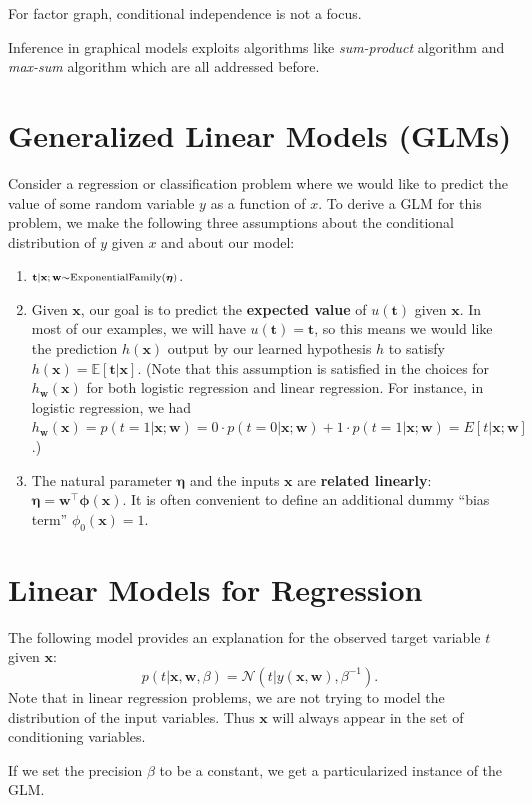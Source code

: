 \documentclass[a4paper]{book}
\newcommand{\up}{\mathrm}
\newcommand{\wave}{\scriptsize{\sim}}
\renewcommand{\bf}{\mathbf}
\renewcommand{\cal}{\mathcal}
\newcommand{\bb}{\mathbb}
\newcommand{\imp}[1]{\textit{#1}}
\newcommand{\bs}{\boldsymbol}
\begin{document}
For factor graph, conditional independence is not a focus.

Inference in graphical models exploits algorithms like \imp{sum-product} algorithm and \imp{max-sum} algorithm which are all addressed before.
\section{Generalized Linear Models (GLMs)}
Consider a regression or classification problem where we would like to predict the value of some random variable $y$ as a function of $x$. To derive a GLM for this problem, we make the following three assumptions about the conditional distribution of $y$ given $x$ and about our model:
\begin{enumerate}
	\item $\bf{t}|\bf{x};\bf{w} \wave \up{ExponentialFamily}(\bs{\eta})$.		
	\item Given $\bf{x}$, our goal is to predict the \textbf{expected value} of $u(\bf{t})$ given $\bf{x}$.
	In most of our examples, we will have $u(\bf{t}) = \bf{t}$, so this means we
	would like the prediction $h(\bf{x})$ output by our learned hypothesis $h$ to satisfy $h(\bf{x})=\bb{E}[\bf{t|x}]$. (Note that this assumption is satisfied in the choices for $h_{\bf{w}}(\bf{x})$ for both logistic regression and linear regression. For
	instance, in logistic regression, we had $h_{\bf{w}}(\bf{x}) = p(t = 1|\bf{x};\bf{w})=0 \cdot p(t=0|\bf{x};\bf{w}) + 1\cdot p(t = 1|\bf{x};\bf{w})=E[t|\bf{x}; \bf{w}]$.)
	\item The natural parameter $\bs{\eta}$ and the inputs $\bf{x}$ are \textbf{related linearly}: $ \bs{\eta} = \bf{w}^{\intercal} \bs{\phi}(\bf{x})$. It is often convenient to define an additional dummy ``bias term'' $\phi_0(\bf{x})=1$.
\end{enumerate}
\section{Linear Models for Regression}\label{LMR}
The following model provides an explanation for the observed target variable $t$ given $\bf{x}$:
\begin{equation}
	p(t|\bf{x,w},\beta) = \cal{N}(t|y(\bf{x,w}),\beta^{-1}). \label{LinearR}
\end{equation}
Note that in linear regression problems, we are not trying to model the distribution of the input variables. Thus $\bf{x}$ will always appear in the set of conditioning variables.

If we set the precision $\beta$ to be a constant, we get a particularized instance of the GLM. 
\end{document}
